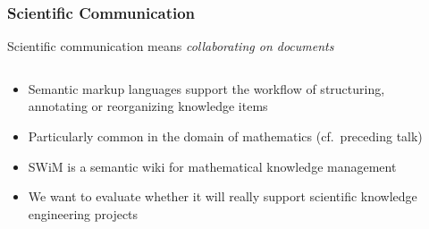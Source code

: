 \documentclass[pdftex]{beamer}
\begin{document}
\begin{frame}
    \frametitle{Scientific Communication}
    Scientific communication means \emph{collaborating on documents}
    \begin{columns}
      \begin{column}{.6\textwidth}
        \begin{itemize}
        \item Semantic markup languages support the workflow of structuring,
          annotating or reorganizing knowledge items
        \item Particularly common in the domain of mathematics (cf.\ preceding talk)
        \item SWiM is a semantic wiki for mathematical knowledge management
        \item We want to evaluate whether it will really support scientific
          knowledge engineering projects
        \end{itemize}
      \end{column}
      \begin{column}{.38\textwidth}
      \end{column}
    \end{columns}
\end{frame}
\end{document}
